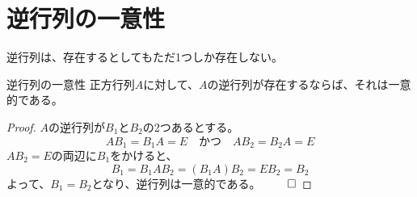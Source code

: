 \documentclass[../../../topic_linear-algebra]{subfiles}
\begin{document}
\sectionline
\section{逆行列の一意性}

逆行列は、存在するとしてもただ1つしか存在しない。

\begin{theorem}{逆行列の一意性}
  正方行列$A$に対して、$A$の逆行列が存在するならば、それは一意的である。
\end{theorem}

\begin{proof}
  $A$の逆行列が$B_1$と$B_2$の2つあるとする。
  \begin{equation*}
    AB_1 = B_1A = E \quad \text{かつ} \quad AB_2 = B_2A = E
  \end{equation*}
  $AB_2 = E$の両辺に$B_1$をかけると、
  \begin{equation*}
    B_1 = B_1 AB_2 = (B_1 A) B_2 = E B_2 = B_2
  \end{equation*}
  よって、$B_1 = B_2$となり、逆行列は一意的である。 $\qed$
\end{proof}
\end{document}
